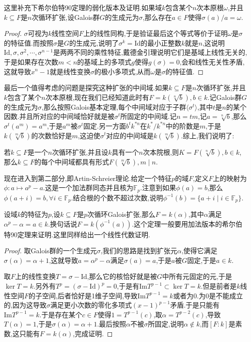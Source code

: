这里补充下希尔伯特90定理的弱化版本及证明.如果域$k$包含某个$n$次本原根$\omega$,并且$k\subseteq F$是$n$次循环扩张,设Galois群$G$的生成元为$\sigma$,那么存在$a\in F$使得$\sigma(a)/a=\omega$.
\begin{proof}
	
	$\sigma$可视为$k$线性空间$F$上的线性同构,于是验证最后这个等式等价于证明$\omega$是$\sigma$的特征值.而按照$\sigma$是$G$的生成元,说明了$\sigma^k=\mathrm{Id}$的最小正整数$k$就是$n$,这说明$\mathrm{Id},\sigma,\sigma^2,\cdots,\sigma^{n-1}$是两两不同的乘性特征,戴德金引理说明它们是基域上线性无关的,于是如果存在次数$m<n$的基域上的多项式$g$使得$g(\sigma)=0$,会和线性无关性矛盾,这就导致$x^n-1$就是线性变换$\sigma$的极小多项式,从而$\omega$是$\sigma$的特征值.
\end{proof}

最后一个值得考虑的问题是探究这种扩张的中间域.如果$k\subseteq F$是$n$次循环扩张,并且$k$包含了某个$n$次本原根,现在我们已经知道此时有$F=k(\sqrt[n]{b}),b\in k$.记Galois群$G$的生成元为$\sigma$,那么按照Galois基本定理,每个中间域对应于子群$\langle\sigma^t\rangle$,其中$t$是$n$的某个因数.并且所对应的中间域恰好就是被$\sigma^t$所固定的中间域.记$n=tm$,记$a=\sqrt[n]{b}$,那么$\sigma^t(a^m)=a^m$,于是$a^m$被$\sigma^t$固定.另一方面$b^tk^{*n}$在$k^*/k^{*n}$中的阶数是$m$,于是$k(\sqrt[m]{b})$的次数恰好是$m$,这迫使$\sigma^t$对应的中间域是$k(\sqrt[m]{b})$.综上,我们说明了:

若$k\subseteq F$是一个$n$次循环扩张,并且设$k$具有一个$n$次本院根,则$K=F(\sqrt[n]{b}),b\in k$,那么$k\subseteq F$的每个中间域都具有形式$F(\sqrt[m]{b}),m\mid n$.

现在进入到第二部分,即Artin-Schreier理论.给定一个特征$p$的域$F$,定义$F$上的映射为$\phi:a\mapsto a^p-a$.这是一个加法群同态并且核为$\mathbb{F}_p$.注意到如果$\phi(a)=b$,那么$\phi(a+i)=b,\forall i\in\mathbb{F}_p$.结合根的个数不超过次数,说明$\phi^{-1}(b)=\{a+i\mid i\in\mathbb{F}_p\}$.

设域$k$的特征为$p$,设$k\subseteq F$是$p$次循环Galois扩张,那么$F=k(\alpha)$,其中$\alpha$满足$\alpha^p-\alpha=a\in k$.换句话说$F=k(\phi^{-1}(a))$.这个定理一般要用加法版本的希尔伯特90定理来证明.这里同样给出一个线性代数证明.
\begin{proof}
	
	取Galois群的一个生成元$\sigma$,我们的思路是找到扩张元$\alpha$,使得它满足$\sigma(\alpha)=\alpha+1$,这就导致$a=\alpha^p-\alpha$满足$\sigma(a)=a$,于是$a$被$G$固定,于是$a\in k$.
	
	取$F$上的线性变换$T=\sigma-\mathrm{Id}$,那么它的核恰好就是被$G$中所有元固定的元,于是$\ker T=k$.另外有$T^p=(\sigma-\mathrm{Id})^p=0$,于是有$\mathrm{Im}T^{p-1}\subset\ker T=k$.但是前者是$k$线性空间$F$的子空间,后者恰好是1维子空间,导致$\mathrm{Im}T^{p-1}=k$或者为0.为0是不能成立的,因为这导致$\sigma$满足更小次数的零化多项式$(x-1)^{p-1}$矛盾.于是只能有$\mathrm{Im}T^{p-1}=k$.于是存在某个$c\in F$使得$1=T^{p-1}(c)$,取$\alpha=T^{p-2}(c)$,导致$T(\alpha)=1$,于是$\sigma(\alpha)=\alpha+1$.最后按照$\alpha$不被$\sigma$所固定,说明$\alpha\not\in k$,而$[F:k]$是素数,这只能有$F=k(\alpha)$,完成证明.
\end{proof}

